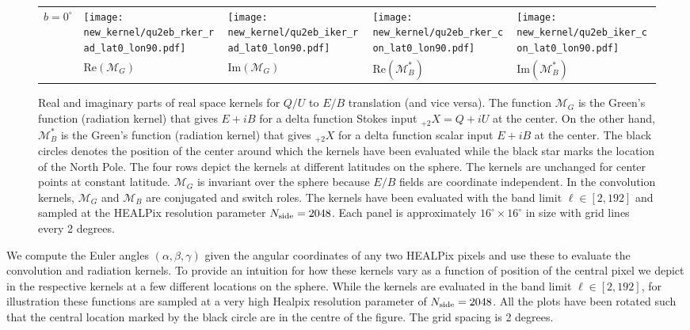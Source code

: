 \begin{figure}[t]
\begin{center}
\begin{tabular}{m{8ex}m{}m{}|m{}m{}}
$b=0^\circ$&
\hspace{\kernelfigspace}\texttt{[image: new\_kernel/qu2eb\_rker\_rad\_lat0\_lon90.pdf]} &
\hspace{\kernelfigspace}\texttt{[image: new\_kernel/qu2eb\_iker\_rad\_lat0\_lon90.pdf]} &
\hspace{\kernelfigspace}\texttt{[image: new\_kernel/qu2eb\_rker\_con\_lat0\_lon90.pdf]} &
\hspace{\kernelfigspace}\texttt{[image: new\_kernel/qu2eb\_iker\_con\_lat0\_lon90.pdf]} \\
&
\centering $ \textrm{Re} \left(\mathcal{M}_{G} \right) $ &
\centering $\textrm{Im} \left(\mathcal{M}_{G} \right) $ &
\centering $\textrm{Re}  \left(\mathcal{M}_{B}^* \right) $ &
\centering $\textrm{Im} \left(\mathcal{M}_{B}^* \right) $
\end{tabular}
\end{center}
  \caption{Real and imaginary parts of real space kernels for $Q/U$ to $E/B$ translation (and vice versa).  The function $\mathcal{M}_{G}$ is the Green's function (radiation kernel) that gives $E+iB$ for a delta function Stokes input $_{+2}X = Q+iU$ at the center.  On the other hand, $\mathcal{M}^*_{B}$ is the Green's function (radiation kernel) that gives $_{+2}X$ for a delta function scalar input $E+iB$ at the center.  The black circles denotes the position of the center around which the kernels have been evaluated while the black star marks the location of the North Pole. The four rows depict the kernels at different latitudes on the sphere.   The kernels are unchanged for center points at constant latitude.  $\mathcal{M}_G$ is invariant over the sphere because $E/B$ fields are coordinate independent.  In the convolution kernels, $\mathcal{M}_G$ and $\mathcal{M}_B$ are conjugated and switch roles.  The kernels have been evaluated with the band limit $\ell \in [2,192]$ and sampled at the HEALPix resolution parameter $N_{\rm side}=2048$. Each panel is approximately $16^{\circ} \times 16^{\circ}$ in size with grid lines every 2 degrees. } \label{fig:vis_kernel} 
\end{figure}
%
We compute the Euler angles $(\alpha, \beta, \gamma)$ given the angular coordinates of any two HEALPix pixels and use these to evaluate the convolution and radiation kernels. To provide an intuition for how these kernels vary as a function of position of the central pixel we depict in  the respective kernels at a few different locations on the sphere.
While the kernels are evaluated in the band limit $\ell \in [2,192]$, for illustration these functions are sampled at a very high Healpix resolution parameter of $N_{\rm side}=2048$. All the plots have been rotated such that the central location marked by the black circle are in the centre of the figure. The grid spacing is 2 degrees.

